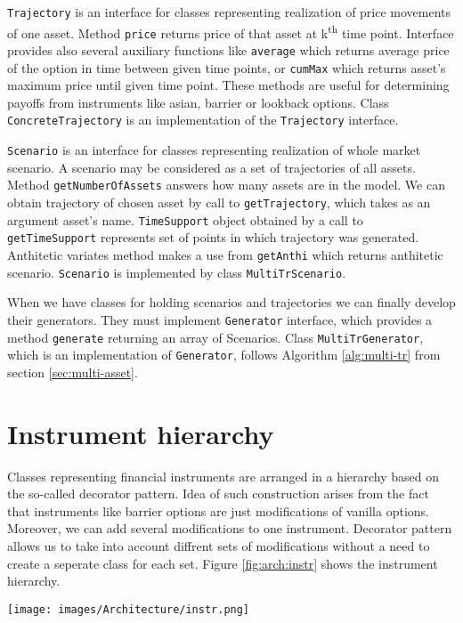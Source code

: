 \documentclass[a4paper,12pt, oneside]{book}
\theoremstyle{definition}
\theoremstyle{remark}
\begin{document}
\texttt{Trajectory} is an interface for classes representing realization of price movements of one asset. Method \texttt{price} returns price of that asset at k\textsuperscript{th} time point. Interface provides also several auxiliary functions like \texttt{average} which returns average price of the option in time between given time points, or \texttt{cumMax} which returns asset's maximum price until given time point. These methods are useful for determining payoffs from instruments like asian, barrier or lookback options. Class \texttt{ConcreteTrajectory} is an implementation of the \texttt{Trajectory} interface.

\texttt{Scenario} is an interface for classes representing realization of whole market scenario. A scenario may be considered as a set of trajectories of all assets. Method \texttt{getNumberOfAssets} answers how many assets are in the model. We can obtain trajectory of chosen asset by call to \texttt{getTrajectory}, which takes as an argument asset's name. \texttt{TimeSupport} object obtained by a call to \texttt{getTimeSupport} represents set of points in which trajectory was generated. Anthitetic variates method makes a use from \texttt{getAnthi} which returns anthitetic scenario. \texttt{Scenario} is implemented by class \texttt{MultiTrScenario}.

When we have classes for holding scenarios and trajectories we can finally develop their generators. They must implement \texttt{Generator} interface, which provides a method \texttt{generate} returning an array of Scenarios. Class \texttt{MultiTrGenerator}, which is an implementation of \texttt{Generator}, follows Algorithm \ref{alg:multi-tr} from section \ref{sec:multi-asset}.

\section{Instrument hierarchy}
Classes representing financial instruments are arranged in a hierarchy based on the so-called decorator pattern. Idea of such construction arises from the fact that instruments like barrier options are just modifications of vanilla options. Moreover, we can add several modifications to one instrument. Decorator pattern allows us to take into account diffrent sets of modifications without a need to create a seperate class for each set. Figure \ref{fig:arch:instr} shows the instrument hierarchy.
\begin{sidewaysfigure}
\centering
 \texttt{[image: images/Architecture/instr.png]}
\caption{Class diagram presenting hierarchy of financial instruments.}
\label{fig:arch:instr}
\end{sidewaysfigure}
\end{document}
